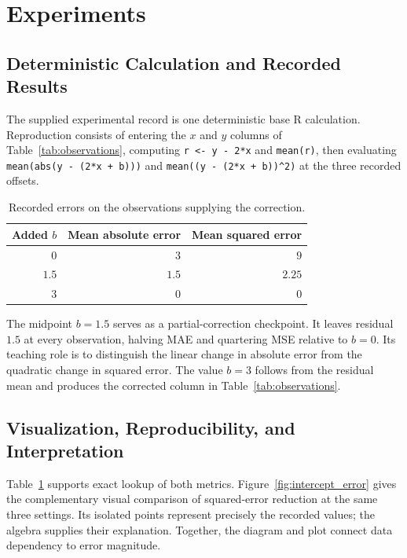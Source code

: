 \documentclass[11pt]{article}
\begin{document}
\section{Experiments}

\subsection{Deterministic Calculation and Recorded Results}

The supplied experimental record is one deterministic base R calculation. Reproduction consists of entering the $x$ and $y$ columns of Table~\ref{tab:observations}, computing \verb|r <- y - 2*x| and \verb|mean(r)|, then evaluating \verb|mean(abs(y - (2*x + b)))| and \verb|mean((y - (2*x + b))^2)| at the three recorded offsets.

\begin{table}[htbp]
    \centering
    \caption{Recorded errors on the observations supplying the correction.}
    \label{tab:errors}
    \begin{tabular}{rrr}
        \toprule
        Added $b$ & Mean absolute error & Mean squared error \\
        \midrule
        $0$   & $3$   & $9$    \\
        $1.5$ & $1.5$ & $2.25$ \\
        $3$   & $0$   & $0$    \\
        \bottomrule
    \end{tabular}
\end{table}

The midpoint $b=1.5$ serves as a partial-correction checkpoint. It leaves residual $1.5$ at every observation, halving MAE and quartering MSE relative to $b=0$. Its teaching role is to distinguish the linear change in absolute error from the quadratic change in squared error. The value $b=3$ follows from the residual mean and produces the corrected column in Table~\ref{tab:observations}.

\subsection{Visualization, Reproducibility, and Interpretation}

Table~\ref{tab:errors} supports exact lookup of both metrics. Figure~\ref{fig:intercept_error} gives the complementary visual comparison of squared-error reduction at the same three settings. Its isolated points represent precisely the recorded values; the algebra supplies their explanation. Together, the diagram and plot connect data dependency to error magnitude.
\end{document}
